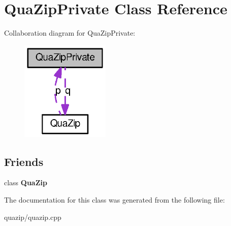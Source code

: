 \section{QuaZipPrivate Class Reference}
\label{classQuaZipPrivate}


Collaboration diagram for QuaZipPrivate:
\nopagebreak
\begin{figure}[H]
\begin{center}
\leavevmode
\includegraphics[width=120pt]{classQuaZipPrivate__coll__graph}
\end{center}
\end{figure}
\subsection*{Friends}
\begin{DoxyCompactItemize}
\item 
class {\bf QuaZip}\label{classQuaZipPrivate_a913fb7bbd3527119ebb8052d57132af2}

\end{DoxyCompactItemize}


The documentation for this class was generated from the following file:\begin{DoxyCompactItemize}
\item 
quazip/quazip.cpp\end{DoxyCompactItemize}
